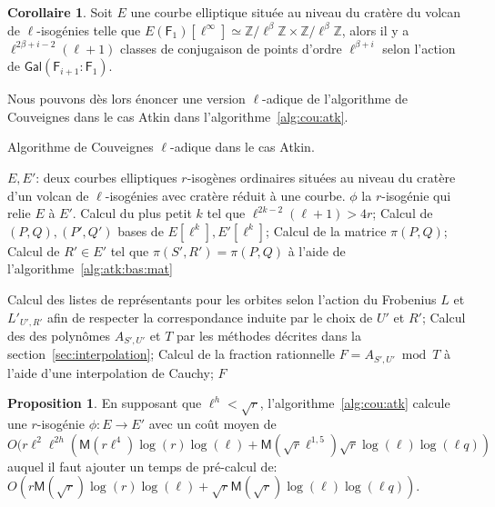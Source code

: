 \documentclass[10pt,a4paper]{book}
\theoremstyle{plain}
\theoremstyle{definition}
\theoremstyle{definition}
\theoremstyle{definition}
\newtheorem{cor}[thm]{Corollaire}
\theoremstyle{definition}
\newtheorem{prop}[thm]{Proposition}
\theoremstyle{definition}
\theoremstyle{remark}
\theoremstyle{remark}
\theoremstyle{definition}
\begin{document}
\begin{cor} \label{cor:atk:orb:rep}
Soit $E$ une courbe elliptique située au niveau du cratère du volcan de 
$\ell$-isogénies telle que $E(\mathsf{F}_1)[\ell^{\infty}] \simeq 
\mathbb{Z}/ \ell^{\beta} \mathbb{Z} \times \mathbb{Z}/ \ell^{\beta}\mathbb{Z}$,
alors il y a $\ell^{2\beta + i -2}(\ell+1)$ classes de conjugaison de points 
d'ordre $\ell^{\beta+i}$ selon l'action de $\mathsf{Gal}(
\mathsf{F}_{i+1}:\mathsf{F}_{1})$.
\end{cor}


Nous pouvons dès lors énoncer une version $\ell$-adique de l'algorithme de 
Couveignes dans le cas Atkin dans l'algorithme~\ref{alg:cou:atk}.
\begin{algorithm}
\caption{\label{alg:cou:atk} Algorithme de Couveignes $\ell$-adique dans le cas Atkin.}
\begin{algorithmic}[1]
\REQUIRE $E,E'$: deux courbes elliptiques $r$-isogènes ordinaires situées au niveau du cratère d'un volcan de $\ell$-isogénies avec cratère réduit à une courbe.
\ENSURE $\phi$ la $r$-isogénie qui relie $E$ à $E'$.
\STATE Calcul du plus petit $k$ tel que $\ell^{2k-2}(\ell+1)>4r$;
\STATE \label{alg:cou:atk:bas} 
Calcul de $(P,Q),(P',Q')$ bases de $E[\ell^k],E'[\ell^k]$;
\STATE \label{alg:cou:atk:frob:bas} Calcul de la matrice $\pi(P,Q)$;
 \label{alg:cou:atk:parc:poi}
\STATE \label{alg:cou:atk:matc:fro} Calcul de $R' \in E'$ tel que $\pi(S',R')=\pi(P,Q)$ à l'aide de l'algorithme~\ref{alg:atk:bas:mat}
 \label{alg:cou:atk:div:h}

\STATE Calcul des listes de représentants pour les orbites selon l'action du Frobenius $L$ et $L'_{U',R'}$ afin de respecter la correspondance induite par le choix de $U'$ et $R'$; \label{alg:cou:atk:rep}
\STATE \label{alg:cou:atk:int} Calcul des des polynômes $A_{S',U'}$ et $T$ par les méthodes décrites dans la section~\ref{sec:interpolation};
\STATE \label{alg:cou:atk:Cauchy} Calcul de la fraction rationnelle $F=A_{S',U'} \bmod T$ à l'aide d'une interpolation de Cauchy;
 \label{alg:cou:atk:test}
\RETURN $F$
\ENDIF
\ENDFOR
\ENDFOR 
\end{algorithmic}
\end{algorithm}

\begin{prop}
  \label{pro:atk:full-complexity}
  En supposant que $\ell^h<\sqrt{r}$, 
  l'algorithme~\ref{alg:cou:atk} calcule une $r$-isogénie 
  ${\phi:E \rightarrow E'}$ avec un coût moyen de \[
  O(r \ell^2 \ell^{2h}(\mathsf{M}(r\ell^4)\log(r)\log(\ell)+\mathsf{M}(\sqrt{r}\ell^{1,5})\sqrt{r}\log(\ell)\log(\ell q))\]
auquel il faut ajouter un temps de pré-calcul de:
$O(r \mathsf{M}(\sqrt{r})\log(r)\log(\ell)+ \sqrt{r} \mathsf{M}(\sqrt{r})\log(\ell)\log(\ell q))$.
\end{prop}
\end{document}
